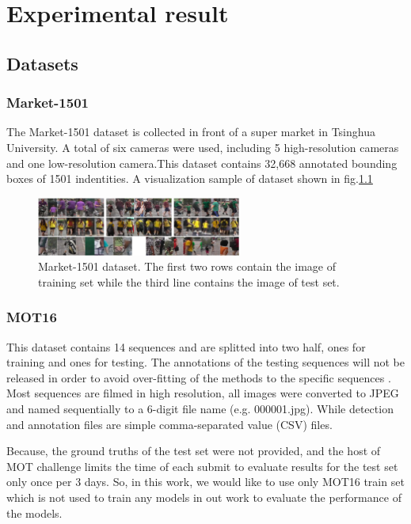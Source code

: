 \chapter{Experimental result}
\label{Chap:4}
\section{Datasets}
\subsection{Market-1501}
\hspace{0.45cm} The Market-1501 dataset is collected in front of a super market in Tsinghua University. A total of six cameras were used, including 5 high-resolution cameras and one low-resolution camera.This dataset contains 32,668 annotated bounding boxes of 1501 indentities\cite{zheng2015scalable}. A visualization sample of dataset shown in fig.\ref{fig:market1501}
\begin{figure}[h!]
    \centering
    \includegraphics[width=0.6\textwidth]{Chapters/Fig/market-1501.jpg}
    \caption{Market-1501 dataset. The first two rows contain the image of training set while the third line contains the image of test set.}
    \label{fig:market1501}
\end{figure}
\subsection{MOT16}
\hspace{0.45cm} This dataset contains 14 sequences and are splitted into two half, ones for training and ones for testing. The annotations of the testing sequences will not be released in order to avoid over-fitting of the methods to the specific sequences \cite{Milan2016MOT16AB}.
Most sequences are filmed in high resolution, all images were converted to JPEG and named sequentially to a 6-digit file name (e.g. 000001.jpg). While detection and annotation files are simple comma-separated value (CSV) files.\par
Because, the ground truths of the test set were not provided, 
and the host of MOT challenge limits the time of each submit to evaluate results for the test set only once per 3 days. 
So, in this work, we would like to use only MOT16 train set which is not used to train any models in out work to evaluate the performance of the models.

